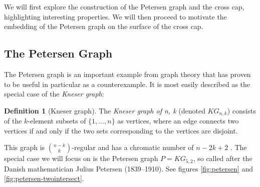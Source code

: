 \documentclass[11pt,            %
               a4paper,         %
               oneside,         %
               DIV12,           %
               fleqn,           %
               halfparskip,     %
               nochapterprefix, %
              ]{scrartcl} %
\theoremstyle{definition}
\newtheorem{definition}{Definition}
\begin{document}
We will first explore the construction of the Petersen graph and the
cross cap, highlighting interesting properties. We will then proceed
to motivate the embedding of the Petersen graph on the surface of the
cross cap.

\subsection{The Petersen Graph}

The Petersen graph is an important example from graph theory that has
proven to be useful in particular as a counterexample. It is most
easily described as the special case of the \emph{Kneser graph}:

\begin{definition}[Kneser graph]
  The \emph{Kneser graph of n, k} (denoted $KG_{n,k}$) consists of
  the $k$-element subsets of $\{1,\ldots,n\}$ as vertices, where an
  edge connects two vertices if and only if the two sets corresponding
  to the vertices are disjoint.
\end{definition}

This graph is ${n-k}\choose k$-regular and has a chromatic number of
$n - 2k + 2$ \cite{kneser}. The special case we will focus on is the
Petersen graph $P = KG_{5,2}$, so called after the Danish
mathematician Julius Petersen (1839--1910). See figures
\ref{fig:petersen} and \ref{fig:petersen-twointersect}.
\end{document}
